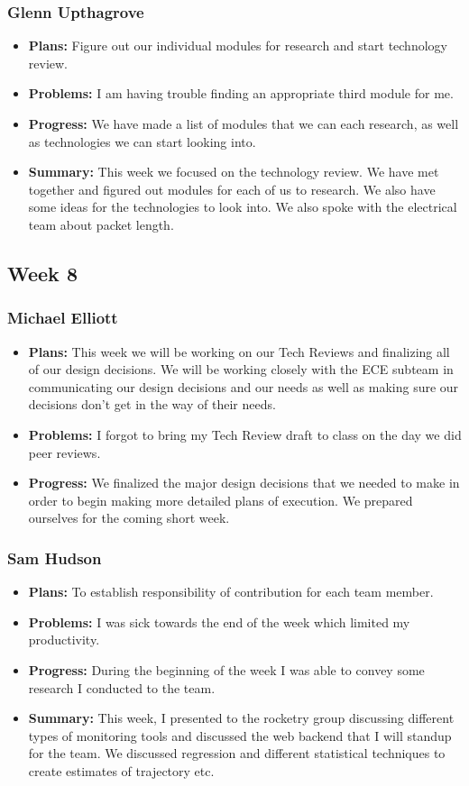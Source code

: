 \documentclass[onecolumn, draftclsnofoot,10pt, compsoc]{IEEEtran}
\begin{document}
\subsubsection{Glenn Upthagrove}
\begin {itemize}
 \item \textbf{Plans: }Figure out our individual modules for research and start technology review.
 \item \textbf{Problems: }I am having trouble finding an appropriate third module for me. 
 \item \textbf{Progress: }We have made a list of modules that we can each research, as well as technologies we can start looking into. 
 \item \textbf{Summary: }This week we focused on the technology review. We have met together and figured out modules for each of us to research. We also have some ideas for the technologies to look into. We also spoke with the electrical team about packet length. 
\end {itemize}
\subsection {Week 8}
\subsubsection{Michael Elliott}
\begin {itemize}
\item \textbf{Plans: }
  This week we will be working on our Tech Reviews and finalizing all of our design decisions. We will be working closely with the ECE subteam in communicating our design decisions and our needs as well as making sure our decisions don't get in the way of their needs.
\item \textbf{Problems: }
  I forgot to bring my Tech Review draft to class on the day we did peer reviews.
\item \textbf{Progress: }
  We finalized the major design decisions that we needed to make in order to begin making more detailed plans of execution. We prepared ourselves for the coming short week.
\end {itemize}
\subsubsection{Sam Hudson}
\begin {itemize}
\item \textbf{Plans: }To establish responsibility of contribution for each team member.
\item \textbf{Problems: }I was sick towards the end of the week which limited my productivity. 
\item \textbf{Progress: }During the beginning of the week I was able to convey some research I conducted to the team.
\item \textbf{Summary: }This week, I presented to the rocketry group discussing different types of monitoring tools and discussed the web backend that I will standup for the team. We discussed regression and different statistical techniques to create estimates of trajectory etc.
\end {itemize}
\end{document}
